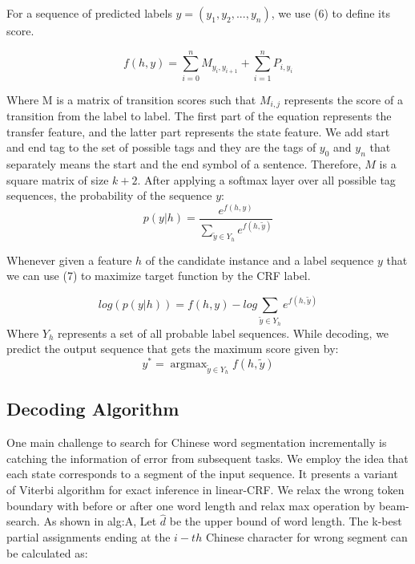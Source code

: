 \documentclass[conference]{IEEEtran}
\begin{document}
For a sequence of predicted labels $y = (y_1,y_2,...,y_n)$, we use (6) to define its score.

\begin{equation}
f(h,y)=\sum_{i=0}^{n}M_{y_i,y_{i+1}}+\sum_{i=1}^{n}P_{i,y_i}\label{eq}
\end{equation}

Where M is a matrix of transition scores such that $M_{i,j}$ represents the score of a transition from the label to label. The first part of the equation represents the transfer feature, and the latter part represents the state feature. We add start and end tag to the set of possible tags and they are the tags of $y_0$ and $y_n$ that separately means the start and the end symbol of a sentence. Therefore, $M$ is a square matrix of size $k + 2$. After applying a softmax layer over all possible tag sequences, the probability of the sequence $y$:
\begin{equation}
p(y|h) = \frac{e^{f(h,y)}}{\sum_{\widetilde{y} \in Y_h}e^{f(h,\widetilde{y})}}\label{eq}
\end{equation}

Whenever given a feature $h$ of the candidate instance and a label sequence $y$ that we can use (7) to maximize target function by the CRF label.

\begin{equation}
log(p(y|h)) = f(h,y)-log\sum_{\widetilde{y}\in Y_h}e^{f(h,\widetilde{y})}\label{eq}
\end{equation}
Where $Y_h$ represents a set of all probable label sequences. While decoding, we predict the output sequence that gets the maximum score given by:
\begin{equation}
y^* = \mathop{\arg\max}_{\widetilde{y} \in Y_h} f(h,\widetilde{y})\label{eq}
\end{equation}

\subsection{Decoding Algorithm}
One main challenge to search for Chinese word segmentation incrementally is catching the information of error from subsequent tasks. We employ the idea that each state corresponds to a segment of the input sequence. It presents a variant of Viterbi algorithm for exact inference in linear-CRF. We relax the wrong token boundary with before or after one word length and relax max operation by beam-search. As shown in {alg:A}, Let $\widehat{d}$ be the upper bound of word length. The k-best partial assignments ending at the $i-th$ Chinese character for wrong segment can be calculated as:
\end{document}

